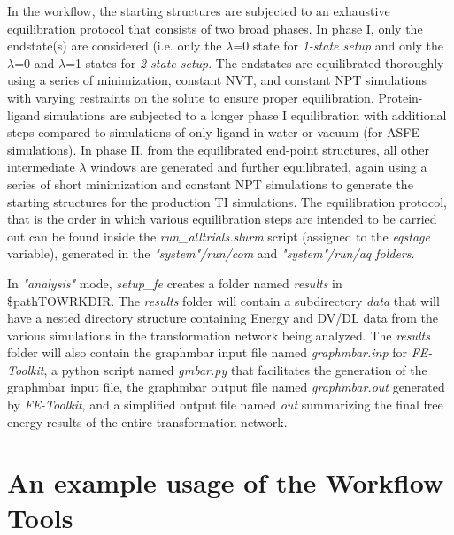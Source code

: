 \documentclass[11pt,letterpaper,titlepage]{article}
\begin{document}
\vspace{0.1cm}

In the workflow, the starting structures are subjected to an exhaustive equilibration protocol
that consists of two broad phases. In phase I, only the endstate(s) are considered (i.e. only the
$\lambda$=0 state for \textit{1-state setup} and only the $\lambda$=0 and $\lambda$=1 states for 
\textit{2-state setup}. The endstates are equilibrated thoroughly using a series of minimization, 
constant NVT, and constant NPT simulations with varying restraints on the solute to ensure proper
equilibration. Protein-ligand simulations are subjected to a longer phase I equilibration with 
additional steps compared to simulations of only ligand in water or vacuum (for ASFE simulations). 
In phase II, from the equilibrated end-point structures, all other intermediate 
$\lambda$ windows are generated and further equilibrated, again using a series of short minimization
and constant NPT simulations to generate the starting structures for the production TI simulations.
The equilibration protocol, that is the order in which various equilibration steps are intended to be 
carried out can be found inside the \textit{run\_alltrials.slurm} script (assigned to the 
\textit{eqstage} variable), generated in the \textit{"system"/run/com} and \textit{"system"/run/aq folders}.

\vspace{0.1cm}

In \textit{"analysis"} mode, \textit{setup\_fe} creates a folder named \textit{results} in \$pathTOWRKDIR. 
The \textit{results} folder will contain a subdirectory \textit{data} that will have a nested directory 
structure containing Energy and DV/DL data from the various simulations in the transformation network 
being analyzed. The \textit{results} folder will also contain the graphmbar input file named
\textit{graphmbar.inp} for \textit{FE-Toolkit}, a python script named \textit{gmbar.py} that facilitates 
the generation of the graphmbar input file, the graphmbar output file named \textit{graphmbar.out} 
generated by \textit{FE-Toolkit}, and a simplified output file named \textit{out} summarizing the final 
free energy results of the entire transformation network.

\vspace{0.1cm}
\section{An example usage of the Workflow Tools}
\vspace{0.1cm}
\end{document}
